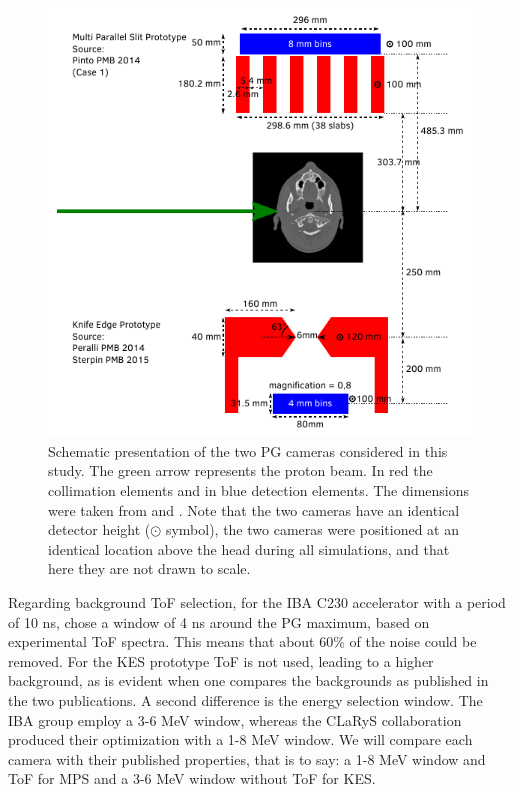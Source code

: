 \documentclass[a4paper,english]{article}
\begin{document}
\begin{figure}[htp]
  \centering
  \includegraphics[width=0.9\linewidth]{detectors}
  \caption{Schematic presentation of the two PG cameras considered in this study. The green arrow represents the proton beam. In red the collimation elements and in blue detection elements. The dimensions were taken from \cite{Pinto2014a} and \cite{Perali2014,Sterpin2015}. Note that the two cameras have an identical detector height ($\odot$ symbol), the two cameras were positioned at an identical location above the head during all simulations, and that here they are not drawn to scale.}
  \label{fig:detectors}
\end{figure}

Regarding background ToF selection, for the IBA C230 accelerator with a period of 10 ns, \cite{Pinto2014a} chose a window of 4 ns around the PG maximum, based on experimental ToF spectra. This means that about 60\% of the noise could be removed. For the KES prototype ToF is not used, leading to a higher background, as is evident when one compares the backgrounds as published in the two publications. A second difference is the energy selection window. The IBA group employ a 3-6 MeV window, whereas the CLaRyS collaboration produced their optimization with a 1-8 MeV window. We will compare each camera with their published properties, that is to say: a 1-8 MeV window and ToF for MPS and a 3-6 MeV window without ToF for KES.
\end{document}
